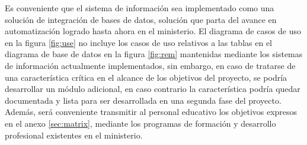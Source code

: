 \documentclass{article}
\begin{document}
\begin{multicols}{6}[]
Es conveniente que el sistema de informaci\'on sea implementado como una soluci\'on de integraci\'on de bases de datos, soluci\'on que parta del avance en automatizaci\'on logrado hasta ahora en el ministerio. El diagrama de casos de uso en la figura \ref{fig:use} no incluye los casos de uso relativos a las tablas en el diagrama de base de datos en la figura \ref{fig:rem} mantenidas mediante los sistemas de informaci\'on actualmente implementados, sin embargo, en caso de tratarse de una caracter\'istica cr\'itica en el alcance de los objetivos del proyecto, se podr\'ia desarrollar un m\'odulo adicional, en caso contrario la caracter\'istica podr\'ia quedar documentada y lista para ser desarrollada en una segunda fase del proyecto. Adem\'as, ser\'a conveniente transmitir al personal educativo los objetivos expresos en el anexo \ref{sec:matrix}, mediante los programas de formaci\'on y desarrollo profesional existentes en el ministerio.




\end{multicols}

\hfill \break
\hfill \break
\hfill \break
\hfill \break
\end{document}
